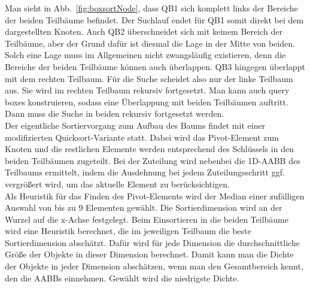 Man sieht in Abb.~\ref{fig:boxsortNode}, dass QB1 sich komplett links der Bereiche der beiden Teilbäume befindet. Der Suchlauf endet für QB1 somit direkt bei dem dargestellten Knoten. Auch QB2 überschneidet sich mit keinem Bereich der Teilbäume, aber der Grund dafür ist diesmal die Lage in der Mitte von beiden. Solch eine Lage muss im Allgemeinen nicht zwangsläufig existieren, denn die Bereiche der beiden Teilbäume können auch überlappen. QB3 hingegen überlappt mit dem rechten Teilbaum. Für die Suche scheidet also nur der linke Teilbaum aus. Sie wird im rechten Teilbaum rekursiv fortgesetzt. Man kann auch query boxes konstruieren, sodass eine Überlappung mit beiden Teilbäumen auftritt. Dann muss die Suche in beiden rekursiv fortgesetzt werden.\\
Der eigentliche Sortiervorgang zum Aufbau des Baums findet mit einer modifizierten Quicksort-Variante statt. Dabei wird das Pivot-Element zum Knoten und die restlichen Elemente werden entsprechend des Schlüssels in den beiden Teilbäumen zugeteilt. Bei der Zuteilung wird nebenbei die 1D-AABB des Teilbaums ermittelt, indem die Ausdehnung bei jedem Zuteilungsschritt ggf. vergrößert wird, um das aktuelle Element zu berücksichtigen.\\
Als Heuristik für das Finden des Pivot-Elements wird der Median einer zufälligen Auswahl von bis zu 9 Elementen gewählt. Die Sortierdimension wird an der Wurzel auf die x-Achse festgelegt. Beim Einsortieren in die beiden Teilbäume wird eine Heuristik berechnet, die im jeweiligen Teilbaum die beste Sortierdimension abschätzt. Dafür wird für jede Dimension die durchschnittliche Größe der Objekte in dieser Dimension berechnet. Damit kann man die Dichte der Objekte in jeder Dimension abschätzen, wenn man den Gesamtbereich kennt, den die AABBs einnehmen. Gewählt wird die niedrigste Dichte.\\
